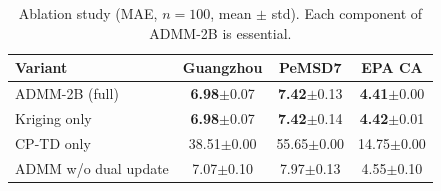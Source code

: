\begin{table}[htbp]
  \centering
  \caption{Ablation study (MAE, $n{=}100$, mean $\pm$ std). Each component of ADMM-2B is essential.}
  \label{tab:ablation}
  \begin{tabular}{lccc}
    \toprule
    Variant & Guangzhou & PeMSD7 & EPA CA \\
    \midrule
    ADMM-2B (full) & \textbf{6.98}$\pm$0.07 & \textbf{7.42}$\pm$0.13 & \textbf{4.41}$\pm$0.00 \\
    Kriging only & \textbf{6.98}$\pm$0.07 & \textbf{7.42}$\pm$0.14 & \textbf{4.42}$\pm$0.01 \\
    CP-TD only & 38.51$\pm$0.00 & 55.65$\pm$0.00 & 14.75$\pm$0.00 \\
    ADMM w/o dual update & 7.07$\pm$0.10 & 7.97$\pm$0.13 & 4.55$\pm$0.10 \\
    \bottomrule
  \end{tabular}
\end{table}